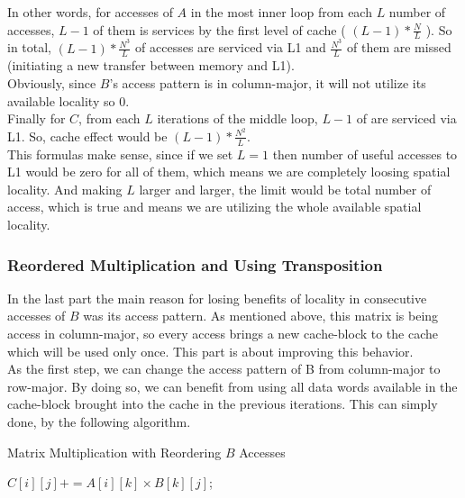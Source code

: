 \documentclass[paper=a4, fontsize=11pt]{scrartcl} %
\numberwithin{equation}{section} %
\numberwithin{figure}{section} %
\numberwithin{table}{section} %
\begin{document}
In other words, for accesses of $A$ in the most inner loop from each $L$ number of accesses, $L-1$ of them is services by the first level of cache ( $(L-1) * \frac{N}{L}$ ). So in total, $(L-1) * \frac{N^{3}}{L}$ of accesses are serviced via L1 and $\frac{N^{3}}{L}$ of them are missed (initiating a new transfer between memory and L1).\\
Obviously, since $B$'s access pattern is in column-major, it will not utilize its available locality so $0$.\\
Finally for $C$, from each $L$ iterations of the middle loop, $L-1$ of are serviced via L1. So, cache effect would be $(L-1) * \frac{N^{2}}{L}$.\\
This formulas make sense, since if we set $L = 1$ then number of useful accesses to L1 would be zero for all of them, which means we are completely loosing spatial locality. And making $L$ larger and larger, the limit would be total number of access, which is true and means we are utilizing the whole available spatial locality.

\subsubsection{Reordered Multiplication and Using Transposition}
In the last part the main reason for losing benefits of locality in consecutive accesses of $B$ was its access pattern. As mentioned above, this matrix is being access in column-major, so every access brings a new cache-block to the cache which will be used only once. This part is about improving this behavior.\\
As the first step, we can change the access pattern of B from column-major to row-major. By doing so, we can benefit from using all data words available in the cache-block brought into the cache in the previous iterations. This can simply done, by the following algorithm.\\

\begin{algorithm}
\caption{Matrix Multiplication with Reordering $B$ Accesses}
\label{Reorder-Alg}
\begin{algorithmic}
		\State $C[ i ][ j ] += A[ i ][ k ] \times B[ k ][ j ]$; 
		\EndFor
	\EndFor
\EndFor
\end{algorithmic}
\end{algorithm}
\end{document}

